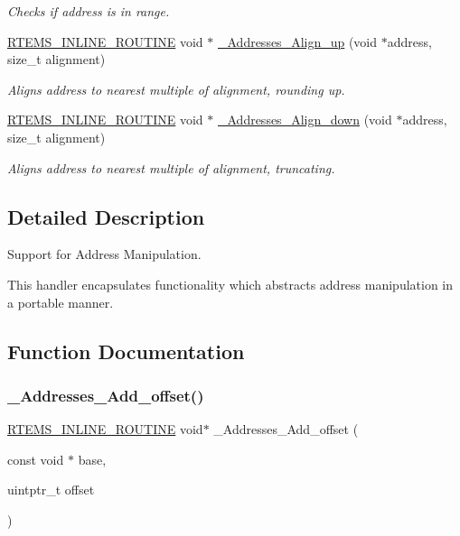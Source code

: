 \begin{DoxyCompactItemize}
\begin{DoxyCompactList}\small\item\em Checks if address is in range. \end{DoxyCompactList}\item 
\mbox{\hyperlink{group__RTEMSScoreBaseDefs_gac216239df231d5dbd15e3520b0b9313f}{R\+T\+E\+M\+S\+\_\+\+I\+N\+L\+I\+N\+E\+\_\+\+R\+O\+U\+T\+I\+NE}} void $\ast$ \mbox{\hyperlink{group__RTEMSScoreAddress_gab881c4be346d10ae3d5b23ed38185600}{\+\_\+\+Addresses\+\_\+\+Align\+\_\+up}} (void $\ast$address, size\+\_\+t alignment)
\begin{DoxyCompactList}\small\item\em Aligns address to nearest multiple of alignment, rounding up. \end{DoxyCompactList}\item 
\mbox{\hyperlink{group__RTEMSScoreBaseDefs_gac216239df231d5dbd15e3520b0b9313f}{R\+T\+E\+M\+S\+\_\+\+I\+N\+L\+I\+N\+E\+\_\+\+R\+O\+U\+T\+I\+NE}} void $\ast$ \mbox{\hyperlink{group__RTEMSScoreAddress_ga967a04986a1d8fa307680f56cfd31e40}{\+\_\+\+Addresses\+\_\+\+Align\+\_\+down}} (void $\ast$address, size\+\_\+t alignment)
\begin{DoxyCompactList}\small\item\em Aligns address to nearest multiple of alignment, truncating. \end{DoxyCompactList}\end{DoxyCompactItemize}


\subsection{Detailed Description}
Support for Address Manipulation. 

This handler encapsulates functionality which abstracts address manipulation in a portable manner. 

\subsection{Function Documentation}
\mbox{\label{group__RTEMSScoreAddress_gaa7812bb29c95ed68f2b958d833c79399}} 
\subsubsection{\texorpdfstring{\_Addresses\_Add\_offset()}{\_Addresses\_Add\_offset()}}
{\footnotesize\ttfamily \mbox{\hyperlink{group__RTEMSScoreBaseDefs_gac216239df231d5dbd15e3520b0b9313f}{R\+T\+E\+M\+S\+\_\+\+I\+N\+L\+I\+N\+E\+\_\+\+R\+O\+U\+T\+I\+NE}} void$\ast$ \+\_\+\+Addresses\+\_\+\+Add\+\_\+offset (\begin{DoxyParamCaption}\item[{const void $\ast$}]{base,  }\item[{uintptr\+\_\+t}]{offset }\end{DoxyParamCaption})}



